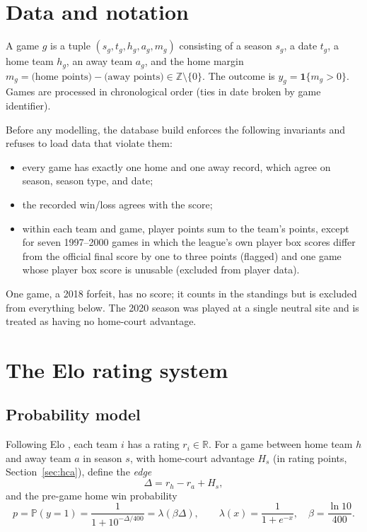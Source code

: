 \documentclass[11pt]{article}
\newcommand{\Prob}{\mathbb{P}}
\newcommand{\ind}{\mathbf{1}}
\theoremstyle{plain}
\theoremstyle{definition}
\theoremstyle{remark}
\begin{document}
\section{Data and notation}\label{sec:data}

A game $g$ is a tuple $(s_g, t_g, h_g, a_g, m_g)$ consisting of a season $s_g$, a date $t_g$, a home team $h_g$, an away team $a_g$, and the home margin $m_g = \text{(home points)} - \text{(away points)} \in \mathbb{Z}\setminus\{0\}$. The outcome is $y_g = \ind\{m_g > 0\}$. Games are processed in chronological order (ties in date broken by game identifier).

Before any modelling, the database build enforces the following invariants and refuses to load data that violate them:
\begin{itemize}
  \item every game has exactly one home and one away record, which agree on season, season type, and date;
  \item the recorded win/loss agrees with the score;
  \item within each team and game, player points sum to the team's points, except for seven 1997--2000 games in which the league's own player box scores differ from the official final score by one to three points (flagged) and one game whose player box score is unusable (excluded from player data).
\end{itemize}
One game, a 2018 forfeit, has no score; it counts in the standings but is excluded from everything below. The 2020 season was played at a single neutral site and is treated as having no home-court advantage.

\section{The Elo rating system}\label{sec:elo}

\subsection{Probability model}

Following Elo \cite{elo1978}, each team $i$ has a rating $r_i \in \mathbb{R}$. For a game between home team $h$ and away team $a$ in season $s$, with home-court advantage $H_s$ (in rating points, Section~\ref{sec:hca}), define the \emph{edge}
\begin{equation}\label{eq:edge}
  \Delta = r_h - r_a + H_s,
\end{equation}
and the pre-game home win probability
\begin{equation}\label{eq:winprob}
  p = \Prob(y = 1) = \frac{1}{1 + 10^{-\Delta/400}} = \lambda\!\left(\beta\Delta\right),
  \qquad \lambda(x) = \frac{1}{1+e^{-x}}, \quad \beta = \frac{\ln 10}{400}.
\end{equation}
\end{document}
